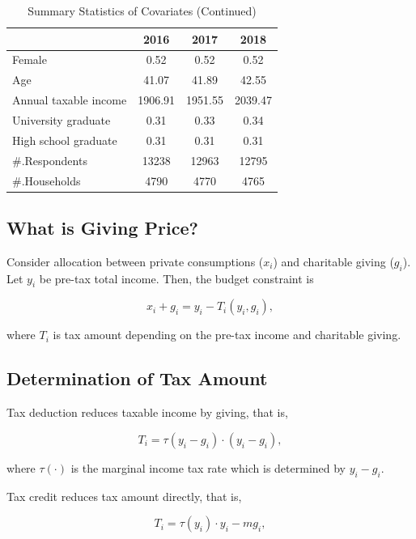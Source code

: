 \documentclass[ review  , 3p ]{elsarticle}
\begin{document}
  \begin{table}

  \caption{\label{tab:kableSummaryCovariate2}Summary Statistics of Covariates (Continued)}
  \centering
  \begin{tabular}[t]{lccc}
  \toprule
   & 2016 & 2017 & 2018\\
  \midrule
  Female & 0.52 & 0.52 & 0.52\\
  Age & 41.07 & 41.89 & 42.55\\
  Annual taxable income & 1906.91 & 1951.55 & 2039.47\\
  University graduate & 0.31 & 0.33 & 0.34\\
  High school graduate & 0.31 & 0.31 & 0.31\\
  \#.Respondents & 13238 & 12963 & 12795\\
  \#.Households & 4790 & 4770 & 4765\\
  \bottomrule
  \end{tabular}
  \end{table}

  \hypertarget{what-is-giving-price}{%
  \subsection{What is Giving Price?}\label{what-is-giving-price}}

  Consider allocation between private consumptions (\(x_i\)) and charitable giving (\(g_i\)).
  Let \(y_i\) be pre-tax total income.
  Then, the budget constraint is

  \[
      x_i + g_i = y_i - T_i(y_i, g_i),
  \]

  where \(T_i\) is tax amount depending on the pre-tax income and charitable giving.

  \hypertarget{determination-of-tax-amount}{%
  \subsection{Determination of Tax Amount}\label{determination-of-tax-amount}}

  Tax deduction reduces taxable income by giving, that is,

  \[
      T_i = \tau(y_i - g_i) \cdot (y_i - g_i),
  \]

  where \(\tau(\cdot)\) is the marginal income tax rate which is determined by \(y_i - g_i\).

  Tax credit reduces tax amount directly, that is,

  \[
      T_i = \tau(y_i)\cdot y_i - m g_i,
  \]
\end{document}
